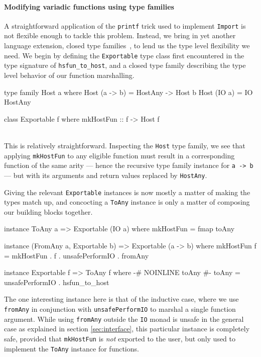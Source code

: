 \documentclass[preprint]{sigplanconf}
\begin{document}
\paragraph{Modifying variadic functions using type families}
A straightforward application of the \lstinline!printf! trick used to
implement \lstinline!Import! is not flexible
enough to tackle this problem. Instead, we bring in yet another language
extension, closed type families\ \cite{closedtypefamilies}, to lend us the type
level flexibility we need. We begin by defining the \lstinline!Exportable!
type class first encountered in the type signature of \lstinline!hsfun_to_host!,
and a closed type family describing the type level behavior of our function
marshalling.\\
\begin{code}
  type family Host a where
    Host (a -> b) = HostAny -> Host b
    Host (IO a)   = IO HostAny

  class Exportable f where
    mkHostFun :: f -> Host f
\end{code}\\
This is relatively straightforward. Inspecting the \lstinline!Host! type
family, we see that applying \lstinline!mkHostFun! to any eligible function
must result in a corresponding function of the same arity --- hence the
recursive type family instance for \lstinline!a -> b! --- but with its
arguments and return values replaced by \lstinline!HostAny!.

Giving the relevant \lstinline!Exportable! instances is now mostly a matter of
making the types match up, and concocting a \lstinline!ToAny! instance is only
a matter of composing our building blocks together.

\begin{code}
  instance ToAny a => Exportable (IO a) where
    mkHostFun = fmap toAny

  instance (FromAny a, Exportable b) =>
            Exportable (a -> b) where
    mkHostFun f =
      mkHostFun . f . unsafePerformIO . fromAny
  
  instance Exportable f => ToAny f where
    {-# NOINLINE toAny #-}
    toAny = unsafePerformIO . hsfun_to_host
\end{code}

The one interesting instance here is that of the inductive case, where we use
\lstinline!fromAny! in conjunction with \lstinline!unsafePerformIO! to marshal
a single function argument. While using \lstinline!fromAny! outside the
\lstinline!IO! monad is unsafe in the general case as explained in section
\ref{sec:interface}, this particular instance is completely safe, provided that
\lstinline!mkHostFun! is \emph{not} exported to the user, but only used to
implement the \lstinline!ToAny! instance for functions.
\end{document}
